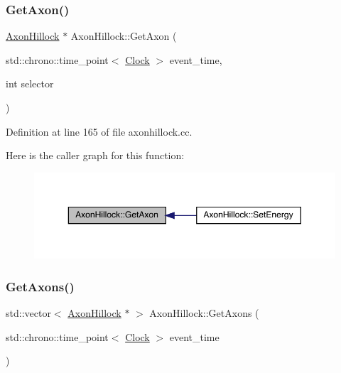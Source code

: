 \subsubsection{\texorpdfstring{Get\+Axon()}{GetAxon()}}
{\footnotesize\ttfamily \hyperlink{class_axon_hillock}{Axon\+Hillock} $\ast$ Axon\+Hillock\+::\+Get\+Axon (\begin{DoxyParamCaption}\item[{std\+::chrono\+::time\+\_\+point$<$ \hyperlink{universe_8h_a0ef8d951d1ca5ab3cfaf7ab4c7a6fd80}{Clock} $>$}]{event\+\_\+time,  }\item[{int}]{selector }\end{DoxyParamCaption})}



Definition at line 165 of file axonhillock.\+cc.

Here is the caller graph for this function\+:
\nopagebreak
\begin{figure}[H]
\begin{center}
\leavevmode
\includegraphics[width=350pt]{class_axon_hillock_a08fde7d1b8a40ba7a052315f95b743f0_icgraph}
\end{center}
\end{figure}
\mbox{\label{class_axon_hillock_af35663768cbe818e092382519a6d73e3}} 
\subsubsection{\texorpdfstring{Get\+Axons()}{GetAxons()}}
{\footnotesize\ttfamily std\+::vector$<$ \hyperlink{class_axon_hillock}{Axon\+Hillock} $\ast$ $>$ Axon\+Hillock\+::\+Get\+Axons (\begin{DoxyParamCaption}\item[{std\+::chrono\+::time\+\_\+point$<$ \hyperlink{universe_8h_a0ef8d951d1ca5ab3cfaf7ab4c7a6fd80}{Clock} $>$}]{event\+\_\+time }\end{DoxyParamCaption})}



